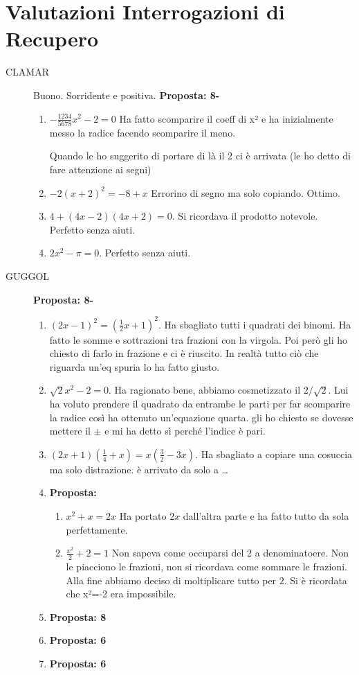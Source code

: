 \documentclass[11pt]{report}
\begin{document}
\chapter{Valutazioni Interrogazioni di Recupero}

\begin{description}
    \item[CLAMAR] Buono. Sorridente e positiva. \textbf{Proposta: 8-}
    
    \begin{enumerate}
    \item $-\frac{1234}{5678}x^2-2=0$
    Ha fatto scomparire il coeff di x² e ha inizialmente messo la radice facendo scomparire il meno.

    Quando le ho suggerito di portare di là il 2 ci è arrivata (le ho detto di fare attenzione ai segni)
    \item $-2(x+2)^2=-8+x$ Errorino di segno ma solo copiando. Ottimo.
    \item $4+(4x-2)(4x+2)=0$. Si ricordava il prodotto notevole. Perfetto senza aiuti.
    \item $2x^2-\pi=0$. Perfetto senza aiuti.
    \end{enumerate}
    \item[GUGGOL] \textbf{Proposta: 8-}
    
    \begin{enumerate}
        \item $(2x-1)^2=(\frac 12x+1)^2$. Ha sbagliato tutti i quadrati dei binomi. Ha fatto le somme e sottrazioni tra frazioni con la virgola. Poi però gli ho chiesto di farlo in frazione e ci è riuscito. In realtà tutto ciò che riguarda un'eq spuria lo ha fatto giusto.
        \item $\sqrt 2 x^2 - 2 =0$. Ha ragionato bene, abbiamo cosmetizzato il $2/{\sqrt 2}.$ Lui ha voluto prendere il quadrato da entrambe le parti per far scomparire la radice così ha ottenuto un'equazione quarta. gli ho chiesto se dovesse mettere il $\pm$ e mi ha detto sì perché l'indice è pari.
        \item $(2x+1)(\frac 14+x)=x(\frac 32-3x).$ Ha sbagliato a copiare una cosuccia ma solo distrazione. è arrivato da solo a \dots
        \item[CARANT] \textbf{Proposta: }
        \begin{enumerate}
            \item $x^2+x=2x$ Ha portato $2x$ dall'altra parte e ha fatto tutto da sola perfettamente.
            \item $\frac{x^2}{2}+2=1$ Non sapeva come occuparsi del 2 a denominatoere. Non le piacciono le frazioni, non si ricordava come sommare le frazioni. Alla fine abbiamo deciso di moltiplicare tutto per $2$. Si è ricordata che x²=-2 era impossibile.
        \end{enumerate}
        \item[GUICER] \textbf{Proposta: 8}
        \item[RICRAO] \textbf{Proposta: 6}
        \item[VALCAS] \textbf{Proposta: 6}  
    \end{enumerate}
\end{description}
\end{document}
